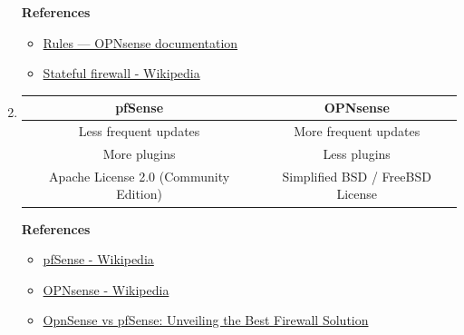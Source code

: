\documentclass[12pt, a4paper]{article}
\begin{document}
\begin{enumerate}
    \textbf{References}
    \begin{itemize}
      \item \href{https://docs.opnsense.org/manual/firewall.html}{Rules — OPNsense  documentation}
      \item \href{https://en.wikipedia.org/wiki/Stateful_firewall}{Stateful firewall - Wikipedia}
    \end{itemize}

    \item \phantom{}\vspace{-\baselineskip}

    \begin{tabular}{|c|c|}
      \hline
      \textbf{pfSense} & \textbf{OPNsense} \\\hline
      Less frequent updates & More frequent updates \\\hline
      More plugins & Less plugins \\\hline
      Apache License 2.0 (Community Edition) & Simplified BSD / FreeBSD License \\\hline
    \end{tabular}

    \pagebreak
    \textbf{References}
    \begin{itemize}
      \item \href{https://en.wikipedia.org/wiki/PfSense}{pfSense - Wikipedia}
      \item \href{https://en.wikipedia.org/wiki/OPNsense}{OPNsense - Wikipedia}
      \item \href{https://www.biteno.com/en/opnsense-vs-pfsense/}{OpnSense vs pfSense: Unveiling the Best Firewall Solution}
    \end{itemize}
  \end{enumerate}
\end{document}

